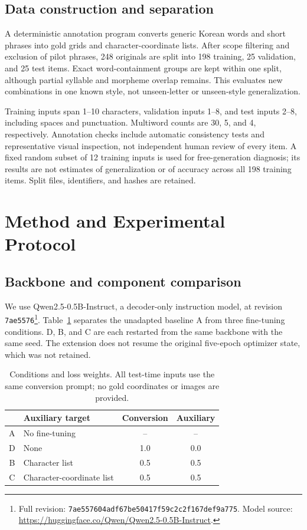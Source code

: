 \documentclass[journal]{IEEEtran}
\begin{document}
\subsection{Data construction and separation}
A deterministic annotation program converts generic Korean words and short phrases into gold grids and character-coordinate lists. After scope filtering and exclusion of pilot phrases, 248 originals are split into 198 training, 25 validation, and 25 test items. Exact word-containment groups are kept within one split, although partial syllable and morpheme overlap remains. This evaluates new combinations in one known style, not unseen-letter or unseen-style generalization.

Training inputs span 1--10 characters, validation inputs 1--8, and test inputs 2--8, including spaces and punctuation. Multiword counts are 30, 5, and 4, respectively. Annotation checks include automatic consistency tests and representative visual inspection, not independent human review of every item. A fixed random subset of 12 training inputs is used for free-generation diagnosis; its results are not estimates of generalization or of accuracy across all 198 training items. Split files, identifiers, and hashes are retained.

\section{Method and Experimental Protocol}
\subsection{Backbone and component comparison}
We use Qwen2.5-0.5B-Instruct, a decoder-only instruction model, at revision \texttt{7ae5576}\footnote{Full revision: \texttt{7ae557604adf67be50417f59c2c2f167def9a775}. Model source: \url{https://huggingface.co/Qwen/Qwen2.5-0.5B-Instruct}.}. Table~\ref{tab:conditions} separates the unadapted baseline A from three fine-tuning conditions. D, B, and C are each restarted from the same backbone with the same seed. The extension does not resume the original five-epoch optimizer state, which was not retained.

\begin{table}[t]
\caption{Conditions and loss weights. All test-time inputs use the same conversion prompt; no gold coordinates or images are provided.}
\label{tab:conditions}\centering
\begin{tabular}{@{}clcc@{}}\toprule
 & Auxiliary target & Conversion & Auxiliary \\\midrule
A & No fine-tuning & -- & -- \\
D & None & 1.0 & 0.0 \\
B & Character list & 0.5 & 0.5 \\
C & Character-coordinate list & 0.5 & 0.5 \\\bottomrule
\end{tabular}
\end{table}
\end{document}
